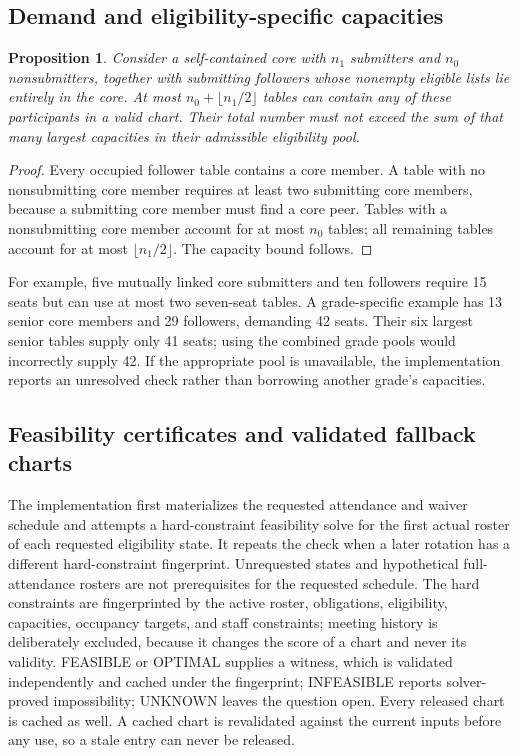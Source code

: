 \documentclass[11pt,a4paper]{article}
\newtheorem{proposition}[theorem]{Proposition}
\theoremstyle{definition}\newtheorem{definition}[theorem]{Definition}
\theoremstyle{remark}\newtheorem{remark}[theorem]{Remark}
\begin{document}
\subsection{Demand and eligibility-specific capacities}
\begin{proposition}\label{prop:demand}
Consider a self-contained core with $n_1$ submitters and $n_0$ nonsubmitters, together with submitting followers whose nonempty eligible lists lie entirely in the core. At most $n_0+\lfloor n_1/2\rfloor$ tables can contain any of these participants in a valid chart. Their total number must not exceed the sum of that many largest capacities in their admissible eligibility pool.
\end{proposition}
\begin{proof}
Every occupied follower table contains a core member. A table with no nonsubmitting core member requires at least two submitting core members, because a submitting core member must find a core peer. Tables with a nonsubmitting core member account for at most $n_0$ tables; all remaining tables account for at most $\lfloor n_1/2\rfloor$. The capacity bound follows.
\end{proof}
For example, five mutually linked core submitters and ten followers require 15 seats but can use at most two seven-seat tables. A grade-specific example has 13 senior core members and 29 followers, demanding 42 seats. Their six largest senior tables supply only 41 seats; using the combined grade pools would incorrectly supply 42. If the appropriate pool is unavailable, the implementation reports an unresolved check rather than borrowing another grade's capacities.

\subsection{Feasibility certificates and validated fallback charts}\label{sec:fallback}
The implementation first materializes the requested attendance and waiver schedule and attempts a hard-constraint feasibility solve for the first actual roster of each requested eligibility state. It repeats the check when a later rotation has a different hard-constraint fingerprint. Unrequested states and hypothetical full-attendance rosters are not prerequisites for the requested schedule. The hard constraints are fingerprinted by the active roster, obligations, eligibility, capacities, occupancy targets, and staff constraints; meeting history is deliberately excluded, because it changes the score of a chart and never its validity. FEASIBLE or OPTIMAL supplies a witness, which is validated independently and cached under the fingerprint; INFEASIBLE reports solver-proved impossibility; UNKNOWN leaves the question open. Every released chart is cached as well. A cached chart is revalidated against the current inputs before any use, so a stale entry can never be released.
\end{document}
